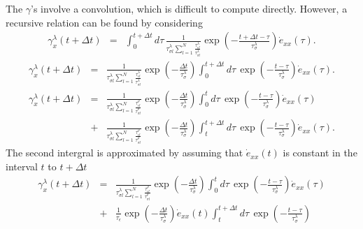 \documentclass[11pt]{article}
\begin{document}
The $\gamma$'s involve a convolution, which is difficult to compute directly.
However, a recursive relation can be found by considering
\begin{eqnarray*}
\gamma^{\lambda}_x(t+\Delta t) & = &
  \int^{t+\Delta t}_0 d\tau\,
  \frac{1}{\tau^{\lambda}_{\sigma l}
   {\sum_{l=1}^N \frac{\tau^{\lambda}_{\epsilon l}}
   {\tau^{\lambda}_{\sigma l}}} }
  \exp(-\frac{t+\Delta t -\tau}{\tau^{\lambda}_{\sigma}})
  \dot{e}_{xx}(\tau).
\end{eqnarray*}
\begin{eqnarray*}
\gamma^{\lambda}_x(t+\Delta t) & = &
  \frac{1}{\tau^{\lambda}_{\sigma l}{\sum_{l=1}^N \frac{\tau^{\lambda}_{\epsilon l}}{\tau^{\lambda}_{\sigma l}}} }
  \exp(-\frac{\Delta t}{\tau^{\lambda}_{\sigma}})
  \int^{t+\Delta t}_{0} d\tau\,
  \exp(-\frac{t-\tau}{\tau^{\lambda}_{\sigma}})
  \dot{e}_{xx}(\tau).
\end{eqnarray*}
\begin{eqnarray*}
\gamma^{\lambda}_x(t+\Delta t) 
 & = & 
  \frac{1}{\tau^{\lambda}_{\sigma l}\sum_{l=1}^N \frac{\tau^{\rho}_{\epsilon l}}{\tau^{\rho}_{\sigma l}}}
  \exp(-\frac{\Delta t}{\tau^{\lambda}_{\sigma}})
  \int^{t}_0 d\tau\,
  \exp(-\frac{t-\tau}{\tau^{\lambda}_{\sigma}})
  \dot{e}_{xx}(\tau)\\
 & + &
  \frac{1}{\tau^{\lambda}_{\sigma l}\sum_{l=1}^N \frac{\tau^{\rho}_{\epsilon l}}{\tau^{\rho}_{\sigma l}}}
  \exp(-\frac{\Delta t}{\tau^{\lambda}_{\sigma}})
  \int^{t+\Delta t}_t d\tau\,
  \exp(-\frac{t-\tau}{\tau^{\lambda}_{\sigma}})
  \dot{e}_{xx}(\tau).
\end{eqnarray*}
The second intergral is approximated by
 assuming that $\dot{e}_{xx}(t)$ is constant in the interval $t$ to $t+\Delta t$
\begin{eqnarray*}
\gamma^{\lambda}_x(t+\Delta t) 
 & = & %
  \frac{1}{\tau^{\lambda}_{\sigma l}\sum_{l=1}^N \frac{\tau^{\rho}_{\epsilon l}}{\tau^{\rho}_{\sigma l}}}
\exp(-\frac{\Delta t}{\tau^{\lambda}_{\sigma}})
       \int^{t}_0 d\tau\,
       \exp(-\frac{t-\tau}{\tau^{\lambda}_{\sigma}})
       \dot{e}_{xx}(\tau)\\
 & + &
       \frac{1}{\tau_{\epsilon}} \exp(-\frac{\Delta t}{\tau^{\lambda}_{\sigma}})
       \dot{e}_{xx}(t)\int^{t+\Delta t}_t d\tau\,
       \exp(-\frac{t-\tau}{\tau^{\lambda}_{\sigma}})
\end{eqnarray*}
\end{document}
